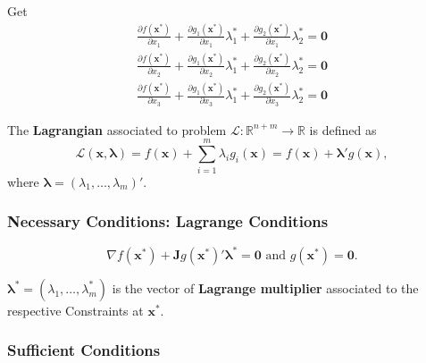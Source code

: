 Get \begin{align*}
    \frac{\partial f(\mathbf{x ^{*}})}{\partial x_1} + \frac{\partial g_1(\mathbf{x ^{*}})}{\partial x_1}\lambda_1^* + \frac{\partial g_2(\mathbf{x ^{*}})}{\partial x_1}\lambda_2 ^*=\mathbf{0} \\
    \frac{\partial f(\mathbf{x ^{*}})}{\partial x_2} + \frac{\partial g_1(\mathbf{x ^{*}})}{\partial x_2}\lambda_1^* + \frac{\partial g_2(\mathbf{x ^{*}})}{\partial x_2}\lambda_2 ^*=\mathbf{0} \\
    \frac{\partial f(\mathbf{x ^{*}})}{\partial x_3} + \frac{\partial g_1(\mathbf{x ^{*}})}{\partial x_3}\lambda_1^* + \frac{\partial g_2(\mathbf{x ^{*}})}{\partial x_3}\lambda_2 ^*=\mathbf{0}
\end{align*}


\begin{definition}
    The \textbf{Lagrangian} associated to problem $\mathcal{L}: \mathbb{R}^{n+m} \to \mathbb{R}$ is defined as \[
        \mathcal{L}(\mathbf{x,\boldsymbol{\lambda}}) = f(\mathbf{x}) + \sum_{i=1}^{m} \lambda_i g_i(\mathbf{x}) = f(\mathbf{x}) + \boldsymbol{\lambda'}g(\mathbf{x}),
    \] where $\mathbf{\lambda} = (\lambda_1, \dots, \lambda_m)'$.
\end{definition}


\subsubsection{Necessary Conditions: \textbf{Lagrange Conditions}}

\[
    \nabla f(\mathbf{x ^{*}}) + \mathbf{J}g(\mathbf{x ^{*}})'\boldsymbol{\lambda ^{*}} = \mathbf{0} \text{ and } g(\mathbf{x ^{*}}) = \mathbf{0}.
\]

\begin{definition}
    $\boldsymbol{\lambda ^{*}} = (\lambda_1, \dots, \lambda_m^*)$ is the vector of \textbf{Lagrange multiplier} associated to the respective Constraints at $\mathbf{x ^{*}}$.
\end{definition}


\subsubsection{Sufficient Conditions}


